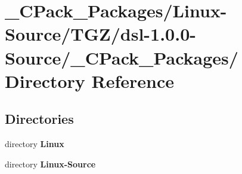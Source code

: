 \section{\_\-CPack\_\-Packages/Linux-\/Source/TGZ/dsl-\/1.0.0-\/Source/\_\-CPack\_\-Packages/ Directory Reference}
\label{dir_1f771403607527815f8ee24dda477d28}
\subsection*{Directories}
\begin{DoxyCompactItemize}
\item 
directory {\bf Linux}
\item 
directory {\bf Linux-\/Source}
\end{DoxyCompactItemize}
